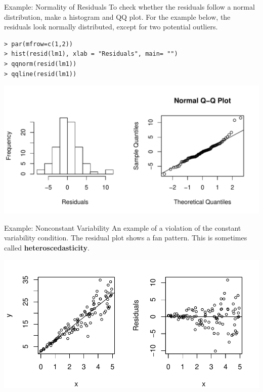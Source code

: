 \documentclass[10pt]{beamer}
\begin{document}
\begin{frame}[fragile]{Example: Normality of Residuals}
To check whether the residuals follow a normal distribution, make a histogram and QQ plot.  For the example below, the residuals look normally distributed, except for two potential outliers.

\small
\begin{verbatim}
> par(mfrow=c(1,2)) 
> hist(resid(lm1), xlab = "Residuals", main= "")
> qqnorm(resid(lm1))
> qqline(resid(lm1))
\end{verbatim}

\centering
\includegraphics[scale=0.55]{figure/cars_norm_resid.pdf}
\end{frame}


\begin{frame}{Example: Nonconstant Variability}
An example of a violation of the constant variability condition.  The residual plot shows a fan pattern.  This is sometimes called \textbf{heteroscedasticity}.

\centering
\includegraphics[scale=0.6]{figure/resid_var.pdf}
\end{frame}
\end{document}
